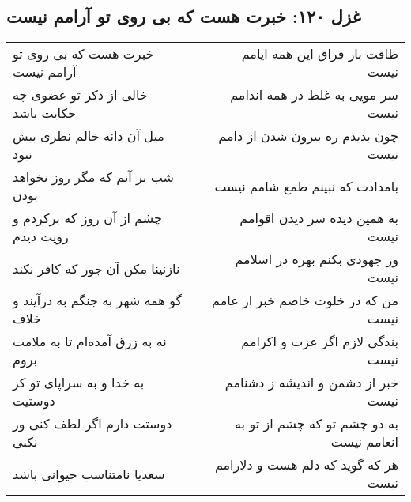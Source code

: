 \begin{center}
\section*{غزل ۱۲۰: خبرت هست که بی روی تو آرامم نیست}
\label{sec:120}
\begin{longtable}{l p{0.5cm} r}
خبرت هست که بی روی تو آرامم نیست
&&
طاقت بار فراق این همه ایامم نیست
\\
خالی از ذکر تو عضوی چه حکایت باشد
&&
سر مویی به غلط در همه اندامم نیست
\\
میل آن دانه خالم نظری بیش نبود
&&
چون بدیدم ره بیرون شدن از دامم نیست
\\
شب بر آنم که مگر روز نخواهد بودن
&&
بامدادت که نبینم طمع شامم نیست
\\
چشم از آن روز که برکردم و رویت دیدم
&&
به همین دیده سر دیدن اقوامم نیست
\\
نازنینا مکن آن جور که کافر نکند
&&
ور جهودی بکنم بهره در اسلامم نیست
\\
گو همه شهر به جنگم به درآیند و خلاف
&&
من که در خلوت خاصم خبر از عامم نیست
\\
نه به زرق آمده‌ام تا به ملامت بروم
&&
بندگی لازم اگر عزت و اکرامم نیست
\\
به خدا و به سراپای تو کز دوستیت
&&
خبر از دشمن و اندیشه ز دشنامم نیست
\\
دوستت دارم اگر لطف کنی ور نکنی
&&
به دو چشم تو که چشم از تو به انعامم نیست
\\
سعدیا نامتناسب حیوانی باشد
&&
هر که گوید که دلم هست و دلارامم نیست
\\
\end{longtable}
\end{center}
